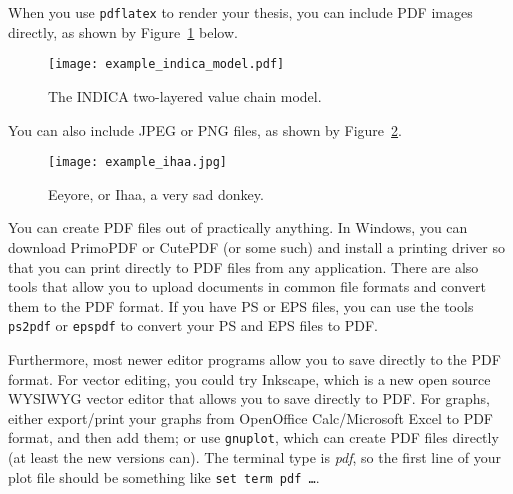 \documentclass[12pt,a4paper,oneside,pdftex]{report}
\begin{document}
When you use \texttt{pdflatex} to render your thesis, you can include PDF images
directly, as shown by Figure~\ref{fig:indica_model} below.

\begin{figure}[ht]
  \begin{center}
    \texttt{[image: example\_indica\_model.pdf]}
    \caption{The INDICA two-layered value chain model.}
    \label{fig:indica_model}
  \end{center}
\end{figure}

You can also include JPEG or PNG files, as shown by Figure~\ref{fig:eeyore}.

\begin{figure}[ht]
  \begin{center}
    \texttt{[image: example\_ihaa.jpg]}
    \caption{Eeyore, or Ihaa, a very sad donkey.}
    \label{fig:eeyore}
  \end{center}
\end{figure}

You can create PDF files out of practically anything.
In Windows, you can download PrimoPDF or CutePDF (or some such) and install a
printing driver so that you can print directly to PDF files from any
application. There are also tools that allow you to upload documents in common
file formats and convert them to the PDF format.
If you have PS or EPS files, you can use the tools \texttt{ps2pdf} or
\texttt{epspdf} to convert your PS and EPS files to PDF\@.



Furthermore, most newer editor programs allow you to save directly to the PDF
format. For vector editing, you could try Inkscape, which is a new open source
WYSIWYG vector editor that allows you to save directly to PDF\@.
For graphs, either export/print your graphs from OpenOffice Calc/Microsoft
Excel to PDF format, and then add them; or use \texttt{gnuplot}, which can
create PDF files directly (at least the new versions can).
The terminal type is \emph{pdf}, so the first line of your plot file should be
something like \texttt{set term pdf \ldots}.
\end{document}
